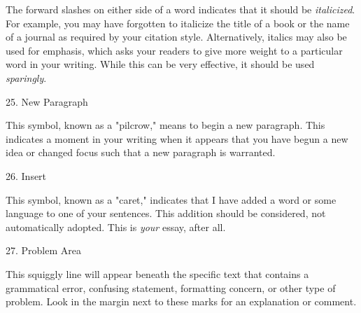 The forward slashes on either side of a word indicates that it should be
\emph{italicized}. For example, you may have forgotten to italicize the title of
a book or the name of a journal as required by your citation style.
Alternatively, italics may also be used for emphasis, which asks your readers to
give more weight to a particular word in your writing. While this can be very
effective, it should be used \emph{sparingly}.

\newpage

 \begin{center}
\bigskip


{\huge 25. New Paragraph} \end{center}

This symbol, known as a "pilcrow," means to begin a new paragraph. This
indicates a moment in your writing when it appears that you have begun a new
idea or changed focus such that a new paragraph is warranted.

 \begin{center}
\bigskip

{\huge 26. Insert} \end{center}

This symbol, known as a "caret," indicates that I have added a word or some
language to one of your sentences. This addition should be considered, not
automatically adopted. This is \emph{your} essay, after all.

 \begin{center}

\bigskip

{\huge 27. Problem Area} \end{center}

This squiggly line will appear beneath the specific text that contains a
grammatical error, confusing statement, formatting concern, or other type of
problem. Look in the margin next to these marks for an explanation or comment.

\stdsectioninToC 
